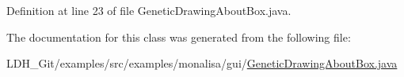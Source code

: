 Definition at line 23 of file Genetic\-Drawing\-About\-Box.\-java.



The documentation for this class was generated from the following file\-:\begin{DoxyCompactItemize}
\item 
L\-D\-H\-\_\-\-Git/examples/src/examples/monalisa/gui/\hyperlink{monalisa_2gui_2_genetic_drawing_about_box_8java}{Genetic\-Drawing\-About\-Box.\-java}\end{DoxyCompactItemize}
